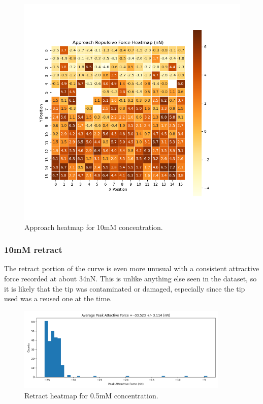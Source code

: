 \begin{figure}[h]
    \centering
    \includegraphics[width=\textwidth]{chapter7/ForceMaps/10mM/Approach heatmap.png}
    \caption{Approach heatmap for 10mM concentration.}
    \label{fig:approach_heatmap_10mM}
\end{figure}

\subsubsection{10mM retract}

The retract portion of the curve is even more unusual with a consistent attractive force recorded at about 34nN. This is unlike anything else seen in the dataset, so it is likely that the tip was contaminated or damaged, especially since the tip used was a reused one at the time.

\begin{figure}[h!!!]
    \centering
    \includegraphics[width=0.9\textwidth]{chapter7/ForceMaps/10mM/contact_force_histogram.png}
    \caption{Retract heatmap for 0.5mM concentration.}
    \label{fig:contfhist}
\end{figure}

